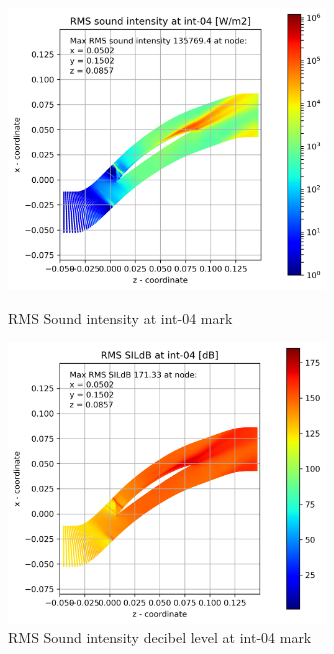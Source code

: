 \begin{figure}[ht]
  \centering
  \includegraphics[width=0.75\textwidth]{Figures/int-04-rms-sil.png}
  \caption{RMS Sound intensity at int-04 mark} \label{int-04-rms-sil}
  
  \vspace*{\floatsep}%

  \includegraphics[width=0.75\textwidth]{Figures/int-04-rms-sildb.png}
  \caption{RMS Sound intensity decibel level at int-04 mark} \label{int-04-rms-sildb}
\end{figure}

